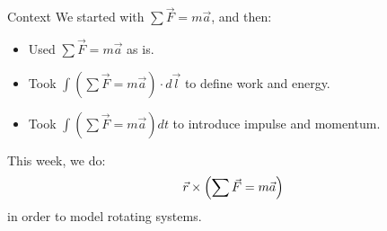 \documentclass[aspectratio=169,
hyperref={colorlinks,urlcolor=blue}
]{beamer}
\begin{document}









\begin{frame}{Context}
We started with $\sum \vec F=m \vec a$, and then:
\begin{itemize}
\item Used $\sum \vec F=m \vec a$ as is.
\item Took $\int (\sum \vec F=m \vec a ) \cdot d\vec l$ to define work and energy.
\item Took $\int (\sum \vec F=m \vec a ) dt$ to introduce impulse and momentum.
\end{itemize}
This week, we do:
\begin{align*}
\vec r \times \Bigl(\sum \vec F=m \vec a \Bigr)
\end{align*}
in order to model rotating systems.
\end{frame}


\end{document}
